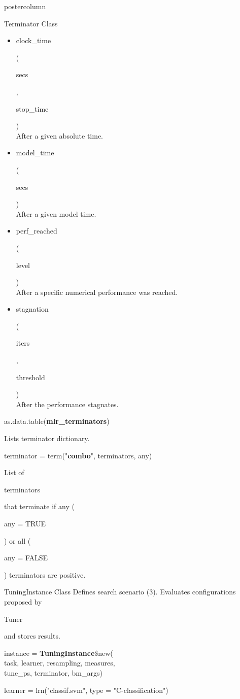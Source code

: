 \documentclass{beamer}
\newcommand{\codeinline}[1]{\begin{codeboxinline}#1\end{codeboxinline}}
\begin{document}
\begin{frame}[fragile]{}
\begin{columns}
\begin{column}{.245\textwidth}
\begin{beamercolorbox}[center]{postercolumn}
\begin{minipage}{.98\textwidth}
{\begin{myblock}{Terminator Class}
\begin{itemize}
                                After a given amount of iterations.
								\item \codeinline{clock\_time} 
								(\codeinline{secs}, \codeinline{stop\_time})\\
								After a given absolute time.
								\item \codeinline{model\_time}
								(\codeinline{secs })\\
								After a given model time.
								\item \codeinline{perf\_reached}
								(\codeinline{level})\\
								After a specific numerical performance was reached.
								\item \codeinline{stagnation}
								(\codeinline{iters}, \codeinline{threshold})\\
								After the performance stagnates.
							\end{itemize}
							\vspace{1em}
							\begin{codebox}
								as.data.table(\textbf{mlr\_terminators})
							\end{codebox}
							Lists terminator dictionary.
							\\
							\begin{codebox}
								terminator = term("\textbf{combo}", terminators, any)
							\end{codebox}
							List of \codeinline{terminators} that terminate 
							if any (\codeinline{any = TRUE}) 
							or all (\codeinline{any = FALSE}) terminators are positive.
						\end{myblock}
						\begin{myblock}{TuningInstance Class}
							Defines search scenario (3). 
							Evaluates configurations proposed by \codeinline{Tuner} and stores results.
							\\
							\begin{codeboxmultiline}[width=23.7cm]
								instance = \textbf{TuningInstance}\$new(\\
								\hspace*{1ex}task, learner, resampling, measures,\\
								\hspace*{1ex}tune\_ps, terminator, bm\_args)
							\end{codeboxmultiline}
							\vspace{1em}
							\begin{codeboxexample}
								{\scriptsize
									learner = lrn("classif.svm", type = "C-classification")\\
}
\end{codeboxexample}
\end{myblock}}
\end{minipage}
\end{beamercolorbox}
\end{column}
\end{columns}
\end{frame}
\end{document}
